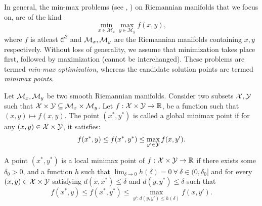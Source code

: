 \begin{definition}
In general, the min-max problems (see \cite{han2023}, \cite{han2024}) on Riemannian manifolds that we focus on, are of the kind
\[
\min_{x \in \mathcal{M}_x} \max_{y \in \mathcal{M}_y} f(x,y),
\]
where $f$ is atleast $\mathcal{C}^2$ and $\mathcal{M}_x,\mathcal{M}_y$ are the Riemannian manifolds containing $x,y$ respectively. Without loss of generality, we assume that minimization takes place first, followed by maximization (cannot be interchanged). These problems are termed \textit{min-max optimization}, whereas the candidate solution points are termed \textit{minimax points}. 

\end{definition}
\begin{definition}
\label{def:global-minimax}
    Let $\mathcal{M}_x, \mathcal{M}_y$ be two smooth Riemannian manifolds. Consider two subsets $\mathcal{X}, \mathcal{Y}$ such that $\mathcal{X} \times \mathcal{Y} \subseteq \mathcal{M}_x \times \mathcal{M}_y$. Let $f: \mathcal{X} \times \mathcal{Y} \to \mathbb{R}$, be a function such that $(x,y) \mapsto f(x,y)$. The point $(x^*, y^*)$ is called a global minimax point if for any $(x,y) \in \mathcal{X} \times \mathcal{Y}$, it satisfies:
    \[
    f(x^*,y) \leq f(x^*, y^*) \leq \max_{y' \in \mathcal{Y}} f(x, y').
    \]
\end{definition}
\begin{definition}
\label{def:local-minimax}
A point $(x^*, y^*)$ is a local minimax point of $f: \mathcal{X} \times \mathcal{Y} \to \mathbb{R}$ if there exists some $\delta_0 > 0$, and a function $h$ such that $\lim_{\delta \to 0} h(\delta) = 0 \ \forall \ \delta \in (0, \delta_0]$ and for every $(x,y) \in \mathcal{X} \times \mathcal{Y}$ satisfying $d(x,x^*) \leq \delta$ and $d(y,y^*) \leq \delta$ such that
\[
f(x^*, y) \leq f(x^*, y^*) \leq \max_{y': d(y,y') \leq h(\delta)} f(x,y').
\]
\end{definition}
